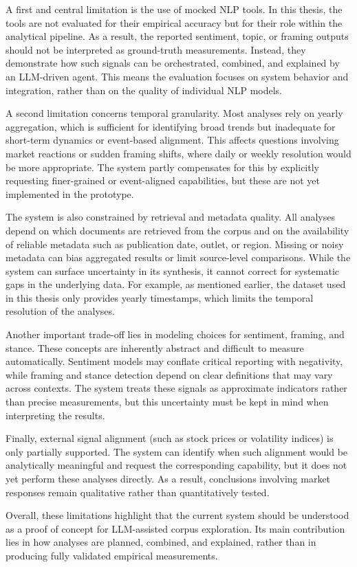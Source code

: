 A first and central limitation is the use of mocked NLP tools. In this thesis, the tools are not evaluated for their empirical accuracy but for their role within the analytical pipeline. As a result, the reported sentiment, topic, or framing outputs should not be interpreted as ground-truth measurements. Instead, they demonstrate how such signals can be orchestrated, combined, and explained by an LLM-driven agent. This means the evaluation focuses on system behavior and integration, rather than on the quality of individual NLP models.

A second limitation concerns temporal granularity. Most analyses rely on yearly aggregation, which is sufficient for identifying broad trends but inadequate for short-term dynamics or event-based alignment. This affects questions involving market reactions or sudden framing shifts, where daily or weekly resolution would be more appropriate. The system partly compensates for this by explicitly requesting finer-grained or event-aligned capabilities, but these are not yet implemented in the prototype.

The system is also constrained by retrieval and metadata quality. All analyses depend on which documents are retrieved from the corpus and on the availability of reliable metadata such as publication date, outlet, or region. Missing or noisy metadata can bias aggregated results or limit source-level comparisons. While the system can surface uncertainty in its synthesis, it cannot correct for systematic gaps in the underlying data.
For example, as mentioned earlier, the dataset used in this thesis only provides yearly timestamps, which limits the temporal resolution of the analyses.

Another important trade-off lies in modeling choices for sentiment, framing, and stance. These concepts are inherently abstract and difficult to measure automatically. Sentiment models may conflate critical reporting with negativity, while framing and stance detection depend on clear definitions that may vary across contexts. The system treats these signals as approximate indicators rather than precise measurements, but this uncertainty must be kept in mind when interpreting the results.

Finally, external signal alignment (such as stock prices or volatility indices) is only partially supported. The system can identify when such alignment would be analytically meaningful and request the corresponding capability, but it does not yet perform these analyses directly. As a result, conclusions involving market responses remain qualitative rather than quantitatively tested.

Overall, these limitations highlight that the current system should be understood as a proof of concept for LLM-assisted corpus exploration. Its main contribution lies in how analyses are planned, combined, and explained, rather than in producing fully validated empirical measurements.